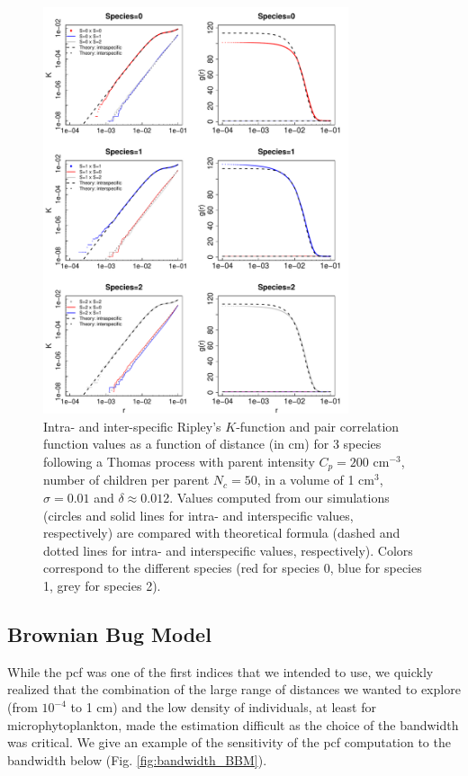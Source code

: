 \documentclass[english]{article}
\begin{document}
\begin{figure}[H]
\begin{centering}
\includegraphics[width=0.8\textwidth]{../code/figure/K_PCF_Thomas}
\par\end{centering}
\caption{Intra- and inter-specific Ripley's $K$-function and pair correlation
function values as a function of distance (in cm) for 3 species following
a Thomas process with parent intensity $C_{p}=200$ cm$^{-3}$, number
of children per parent $N_{c}=50$, in a volume of 1 cm$^{3}$, $\sigma=0.01$
and $\delta\approx0.01$2. Values computed from our simulations (circles
and solid lines for intra- and interspecific values, respectively)
are compared with theoretical formula (dashed and dotted lines for
intra- and interspecific values, respectively). Colors correspond
to the different species (red for species 0, blue for species 1, grey
for species 2). }
\end{figure}

\subsection{Brownian Bug Model}

While the pcf was one of the first indices that we intended to use,
we quickly realized that the combination of the large range of distances
we wanted to explore (from $10^{-4}$ to 1 cm) and the low density
of individuals, at least for microphytoplankton, made the estimation
difficult as the choice of the bandwidth was critical. We give an
example of the sensitivity of the pcf computation to the bandwidth
below (Fig. \ref{fig:bandwidth_BBM}).
\end{document}
